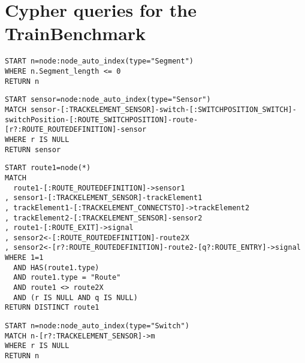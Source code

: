 \chapter{Cypher queries for the TrainBenchmark}
\label{cypherqueries}


\begin{lstlisting}[caption=Cypher query for the PosLength test case, label=lst:, breaklines=true]
START n=node:node_auto_index(type="Segment")
WHERE n.Segment_length <= 0
RETURN n
\end{lstlisting}

\begin{lstlisting}[caption=Cypher query for the RouteSensor test case, label=lst:, breaklines=true]
START sensor=node:node_auto_index(type="Sensor")
MATCH sensor-[:TRACKELEMENT_SENSOR]-switch-[:SWITCHPOSITION_SWITCH]-switchPosition-[:ROUTE_SWITCHPOSITION]-route-[r?:ROUTE_ROUTEDEFINITION]-sensor
WHERE r IS NULL
RETURN sensor
\end{lstlisting}

\begin{lstlisting}[caption=Cypher query for the SignalNeighbor test case, label=lst:, breaklines=true]
START route1=node(*)
MATCH
  route1-[:ROUTE_ROUTEDEFINITION]->sensor1
, sensor1-[:TRACKELEMENT_SENSOR]-trackElement1
, trackElement1-[:TRACKELEMENT_CONNECTSTO]->trackElement2
, trackElement2-[:TRACKELEMENT_SENSOR]-sensor2
, route1-[:ROUTE_EXIT]->signal
, sensor2<-[:ROUTE_ROUTEDEFINITION]-route2X
, sensor2<-[r?:ROUTE_ROUTEDEFINITION]-route2-[q?:ROUTE_ENTRY]->signal
WHERE 1=1
  AND HAS(route1.type)
  AND route1.type = "Route"
  AND route1 <> route2X
  AND (r IS NULL AND q IS NULL)
RETURN DISTINCT route1
\end{lstlisting}

\begin{lstlisting}[caption=Cypher query for the SwitchSensor test case, label=lst:, breaklines=true]
START n=node:node_auto_index(type="Switch")
MATCH n-[r?:TRACKELEMENT_SENSOR]->m
WHERE r IS NULL
RETURN n
\end{lstlisting}
